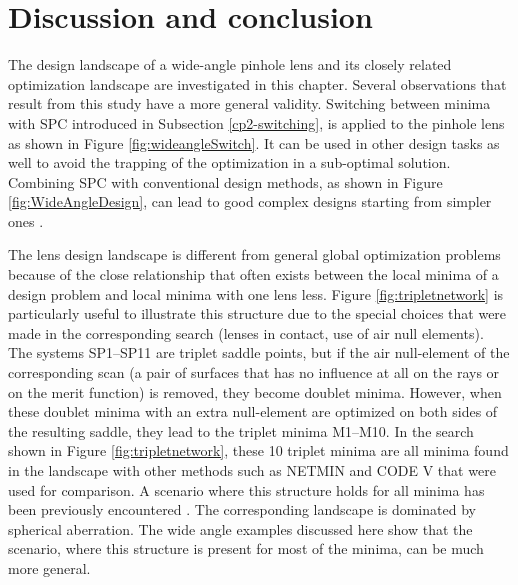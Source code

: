 \section{Discussion and conclusion}
The design landscape of a wide-angle pinhole lens and its closely related optimization landscape are investigated in this chapter. Several observations that result from this study have a more general validity. Switching between minima with SPC introduced in Subsection \ref{cp2-switching}, is applied to the pinhole lens as shown in Figure \ref{fig:wideangleSwitch}. It can be used in other design tasks as well to avoid the trapping of the optimization in a sub-optimal solution. Combining SPC with conventional design methods, as shown in Figure \ref{fig:WideAngleDesign}, can lead to good complex designs starting from simpler ones \cite{LivshitsSP2014}.

The lens design landscape is different from general global optimization problems because of the close relationship that often exists between the local minima of a design problem and local minima with one lens less. Figure \ref{fig:tripletnetwork} is particularly useful to illustrate this structure due to the special choices that were made in the corresponding search (lenses in contact, use of air null elements). The systems SP1–SP11 are triplet saddle points, but if the air null-element of the corresponding scan (a pair of surfaces that has no influence at all on the rays or on the merit function) is removed, they become doublet minima. However, when these doublet minima with an extra null-element are optimized on both sides of the resulting saddle, they lead to the triplet minima M1–M10. In the search shown in Figure \ref{fig:tripletnetwork}, these 10 triplet minima are all minima found in the landscape with other methods such as NETMIN and CODE V that were used for comparison. A scenario where this structure holds for all minima has been previously encountered \cite{PascalTriplet2009}. The corresponding landscape is dominated by spherical aberration. The wide angle examples discussed here show that the scenario, where this structure is present for most of the minima, can be much more general.



